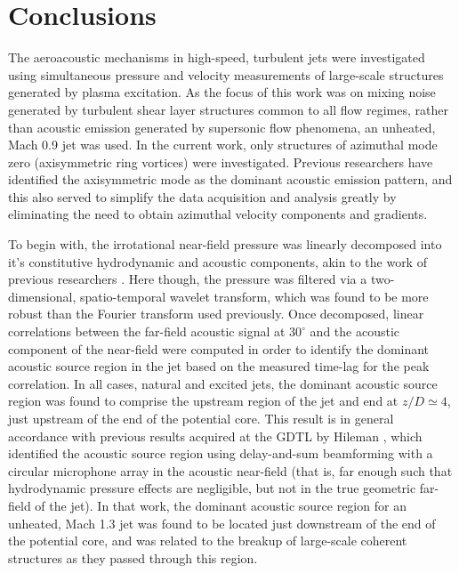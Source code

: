 \chapter{Conclusions}
The aeroacoustic mechanisms in high-speed, turbulent jets were investigated using simultaneous pressure and velocity measurements of large-scale structures generated by plasma excitation.
As the focus of this work was on mixing noise generated by turbulent shear layer structures common to all flow regimes, rather than acoustic emission generated by supersonic flow phenomena, an unheated, Mach 0.9 jet was used.
In the current work, only structures of azimuthal mode zero (axisymmetric ring vortices) were investigated. Previous researchers have identified the axisymmetric mode as the dominant acoustic emission pattern, and this also served to simplify the data acquisition and analysis greatly by eliminating the need to obtain azimuthal velocity components and gradients.

To begin with, the irrotational near-field pressure was linearly decomposed into it's constitutive hydrodynamic and acoustic components, akin to the work of previous researchers \citep{Tinney2008}.
Here though, the pressure was filtered via a two-dimensional, spatio-temporal wavelet transform, which was found to be more robust than the Fourier transform used previously.
Once decomposed, linear correlations between the far-field acoustic signal at $30^\circ$ and the acoustic component of the near-field were computed in order to identify the dominant acoustic source region in the jet based on the measured time-lag for the peak correlation.
In all cases, natural and excited jets, the dominant acoustic source region was found to comprise the upstream region of the jet and end at $z/D \simeq 4$, just upstream of the end of the potential core.
This result is in general accordance with previous results acquired at the GDTL by Hileman \etal \citep{Hileman2005}, which identified the acoustic source region using delay-and-sum beamforming with a circular microphone array in the acoustic near-field (that is, far enough such that hydrodynamic pressure effects are negligible, but not in the true geometric far-field of the jet).
In that work, the dominant acoustic source region for an unheated, Mach 1.3 jet was found to be located just downstream of the end of the potential core, and was related to the breakup of large-scale coherent structures as they passed through this region.

